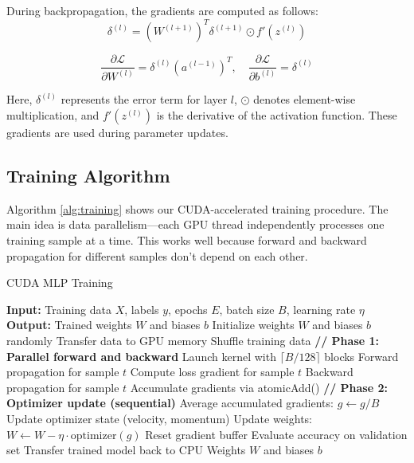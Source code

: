 \documentclass[conference]{IEEEtran}
\begin{document}
During backpropagation, the gradients are computed as follows:
\begin{equation}
\delta^{(l)} = (W^{(l+1)})^T \delta^{(l+1)} \odot f'(z^{(l)})
\end{equation}

\begin{equation}
\frac{\partial \mathcal{L}}{\partial W^{(l)}} = \delta^{(l)} (a^{(l-1)})^T, \quad
\frac{\partial \mathcal{L}}{\partial b^{(l)}} = \delta^{(l)}
\end{equation}

Here, $\delta^{(l)}$ represents the error term for layer $l$, $\odot$ denotes element-wise multiplication, and $f'(z^{(l)})$ is the derivative of the activation function. These gradients are used during parameter updates.


\subsection{Training Algorithm}

Algorithm \ref{alg:training} shows our CUDA-accelerated training procedure. The main idea is data parallelism—each GPU thread independently processes one training sample at a time. This works well because forward and backward propagation for different samples don't depend on each other.

\begin{algorithm}
\caption{CUDA MLP Training}
\label{alg:training}
\begin{algorithmic}[1]
\STATE \textbf{Input:} Training data $X$, labels $y$, epochs $E$, batch size $B$, learning rate $\eta$
\STATE \textbf{Output:} Trained weights $W$ and biases $b$
\STATE
\STATE Initialize weights $W$ and biases $b$ randomly
\STATE Transfer data to GPU memory
    \STATE Shuffle training data
        \STATE \textbf{// Phase 1: Parallel forward and backward}
        \STATE Launch kernel with $\lceil B/128 \rceil$ blocks
            \STATE Forward propagation for sample $t$
            \STATE Compute loss gradient for sample $t$
            \STATE Backward propagation for sample $t$
            \STATE Accumulate gradients via atomicAdd()
        \ENDFOR
        \STATE
        \STATE \textbf{// Phase 2: Optimizer update (sequential)}
        \STATE Average accumulated gradients: $g \leftarrow g / B$
        \STATE Update optimizer state (velocity, momentum)
        \STATE Update weights: $W \leftarrow W - \eta \cdot \text{optimizer}(g)$
        \STATE Reset gradient buffer
    \ENDFOR
    \STATE Evaluate accuracy on validation set
\ENDFOR
\STATE Transfer trained model back to CPU
\RETURN Weights $W$ and biases $b$
\end{algorithmic}
\end{algorithm}
\end{document}
